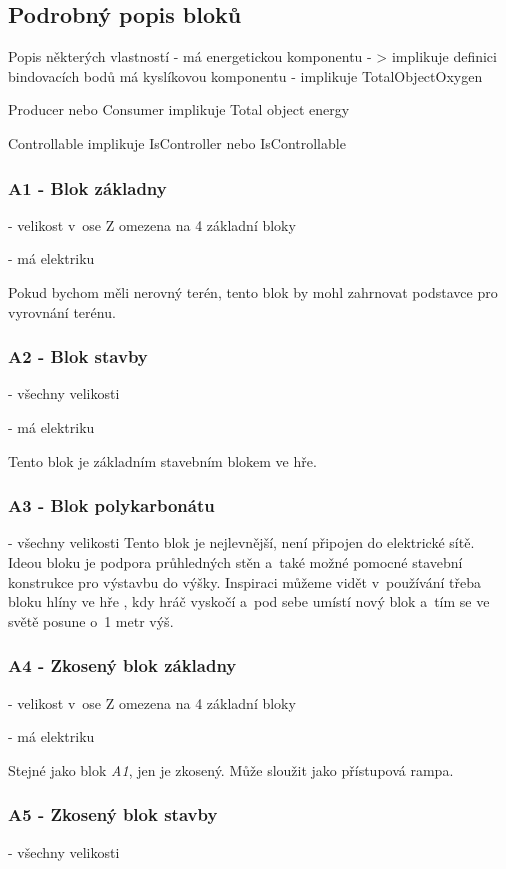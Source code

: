 \subsection{Podrobný popis bloků}

Popis některých vlastností - má energetickou komponentu - > implikuje definici bindovacích bodů
má kyslíkovou komponentu - implikuje TotalObjectOxygen

Producer nebo Consumer implikuje Total object energy

Controllable implikuje IsController nebo IsControllable



\subsubsection{A1 - Blok základny}
- velikost v~ose Z omezena na 4 základní bloky

- má elektriku

Pokud bychom měli nerovný terén, tento blok by mohl zahrnovat podstavce pro vyrovnání terénu.

\subsubsection{A2 - Blok stavby}
- všechny velikosti

- má elektriku

Tento blok je základním stavebním blokem ve hře.

\subsubsection{A3 - Blok polykarbonátu}
- všechny velikosti
Tento blok je nejlevnější, není připojen do elektrické sítě. Ideou bloku je podpora průhledných stěn a~také možné pomocné stavební konstrukce pro výstavbu do výšky. Inspiraci můžeme vidět v~používání třeba bloku hlíny ve hře \MC{}, kdy hráč vyskočí a~pod sebe umístí nový blok a~tím se ve světě posune o~1 metr výš.

\subsubsection{A4 - Zkosený blok základny}
- velikost v~ose Z omezena na 4 základní bloky

- má elektriku

Stejné jako blok \textit{A1}, jen je zkosený. Může sloužit jako přístupová rampa.

\subsubsection{A5 - Zkosený blok stavby}
- všechny velikosti


